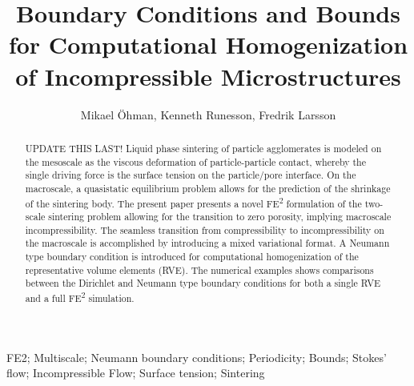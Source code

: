 \documentclass[12pt,a4paper,fleqn]{article}
\title{Boundary Conditions and Bounds for Computational Homogenization of Incompressible Microstructures}
\author{Mikael \"Ohman, Kenneth Runesson, Fredrik Larsson}
\begin{document}

\maketitle

\begin{abstract}
\noindent
UPDATE THIS LAST!
Liquid phase sintering of particle agglomerates is modeled on the mesoscale as the viscous deformation of particle-particle contact, whereby the single driving force is the surface tension on the particle/pore interface.
On the macroscale, a quasistatic equilibrium problem allows for the prediction of the shrinkage of the sintering body.
The present paper presents a novel FE\textsuperscript{2} formulation of the two-scale sintering problem allowing for the transition to zero porosity, implying macroscale incompressibility.
The seamless transition from compressibility to incompressibility on the macroscale is accomplished by introducing a mixed variational format.
A Neumann type boundary condition is introduced for computational homogenization of the representative volume elements (RVE).
The numerical examples shows comparisons between the Dirichlet and Neumann type boundary conditions for both a single RVE and a full FE\textsuperscript{2} simulation.
\end{abstract}
FE2; Multiscale; Neumann boundary conditions; Periodicity; Bounds; Stokes' flow; Incompressible Flow; Surface tension; Sintering

\end{document}
